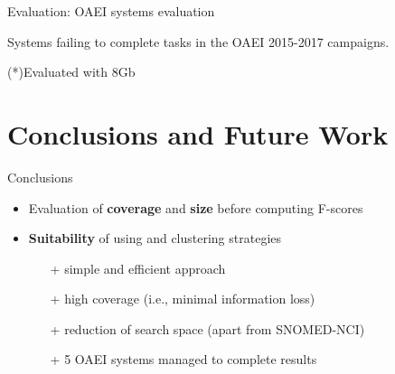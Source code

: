 \documentclass[t]{beamer}
\begin{document}
\begin{frame}{Evaluation: OAEI systems evaluation}
	
	Systems failing to complete tasks in the OAEI
2015-2017 campaigns.

	\vspace{0.4cm}
	
	
	
	{\scriptsize (*)Evaluated with 8Gb}
  		
\end{frame}



% 	
%   	






\section{Conclusions and Future Work}



\begin{frame}{Conclusions}



\begin{itemize}
  
  \item Evaluation of \textbf{coverage} and \textbf{size} before computing
  F-scores  %
  
  \item \textbf{Suitability} of using \textbf{\lex} and clustering strategies
  	\begin{itemize}
  	  	\item[+] simple and efficient approach 
  		\item[+] high coverage (i.e., minimal information loss)
  		\item[+] reduction of search space (apart from SNOMED-NCI)
  		\item[+] 5 OAEI systems managed to complete results
	\end{itemize}
	
	
\end{itemize}


\end{frame}
\end{document}
